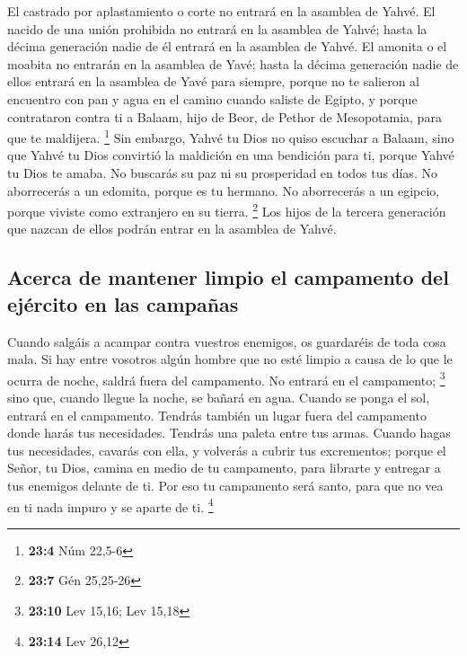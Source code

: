 \begin{paracol}{2}
 El castrado por aplastamiento o corte no entrará en la
asamblea de Yahvé.  El nacido de una unión prohibida no
entrará en la asamblea de Yahvé; hasta la décima generación nadie de él
entrará en la asamblea de Yahvé.  El amonita o el moabita
no entrarán en la asamblea de Yavé; hasta la décima generación nadie de
ellos entrará en la asamblea de Yavé para siempre,  porque
no te salieron al encuentro con pan y agua en el camino cuando saliste
de Egipto, y porque contrataron contra ti a Balaam, hijo de Beor, de
Pethor de Mesopotamia, para que te maldijera. \footnote{\textbf{23:4}
  Núm 22,5-6}  Sin embargo, Yahvé tu Dios no quiso
escuchar a Balaam, sino que Yahvé tu Dios convirtió la maldición en una
bendición para ti, porque Yahvé tu Dios te amaba.  No
buscarás su paz ni su prosperidad en todos tus días.  No
aborrecerás a un edomita, porque es tu hermano. No aborrecerás a un
egipcio, porque viviste como extranjero en su tierra. \footnote{\textbf{23:7}
  Gén 25,25-26}  Los hijos de la tercera generación que
nazcan de ellos podrán entrar en la asamblea de Yahvé.

\hypertarget{acerca-de-mantener-limpio-el-campamento-del-ejuxe9rcito-en-las-campauxf1as}{%
\subsection{Acerca de mantener limpio el campamento del ejército en las
campañas}\label{acerca-de-mantener-limpio-el-campamento-del-ejuxe9rcito-en-las-campauxf1as}}

 Cuando salgáis a acampar contra vuestros enemigos, os
guardaréis de toda cosa mala.  Si hay entre vosotros
algún hombre que no esté limpio a causa de lo que le ocurra de noche,
saldrá fuera del campamento. No entrará en el campamento; \footnote{\textbf{23:10}
  Lev 15,16; Lev 15,18}  sino que, cuando llegue la
noche, se bañará en agua. Cuando se ponga el sol, entrará en el
campamento.  Tendrás también un lugar fuera del
campamento donde harás tus necesidades.  Tendrás una
paleta entre tus armas. Cuando hagas tus necesidades, cavarás con ella,
y volverás a cubrir tus excrementos;  porque el Señor, tu
Dios, camina en medio de tu campamento, para librarte y entregar a tus
enemigos delante de ti. Por eso tu campamento será santo, para que no
vea en ti nada impuro y se aparte de ti. \footnote{\textbf{23:14} Lev
  26,12}


\end{paracol}
